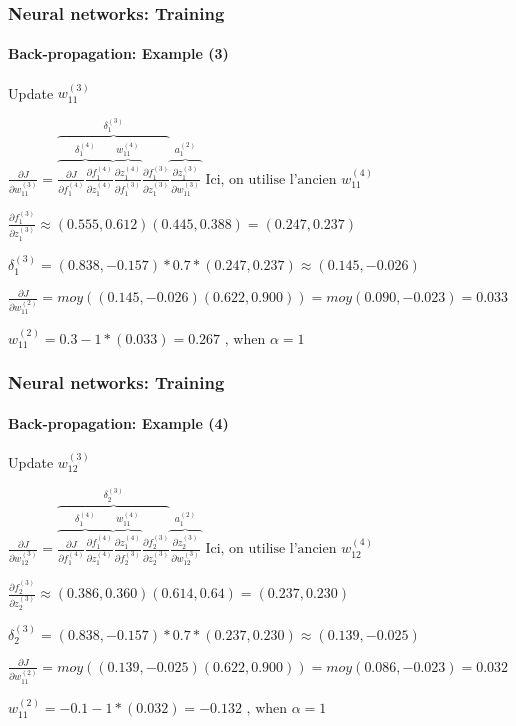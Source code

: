 \documentclass[xcolor=table]{beamer}
\begin{document}
\begin{frame}
	\frametitle{Neural networks: Training}
	\framesubtitle{Back-propagation: Example (3)}
	
	Update $w_{11}^{(3)}$
	
	$
	\frac{\partial J}{\partial w_{11}^{(3)}} = 
	\overbrace{
		\overbrace{
			\frac{\partial J}{\partial f_{1}^{(4)}} 
			\frac{\partial f_{1}^{(4)}}{\partial z_{1}^{(4)}}
		}^{\delta_{1}^{(4)}} 
		\overbrace{
			\frac{\partial z_{1}^{(4)}}{\partial f_{1}^{(3)}}
		}^{w_{11}^{(4)}} 
		\frac{\partial f_{1}^{(3)}}{\partial z_{1}^{(3)}} 
	}^{\delta_{1}^{(3)}} 
	\overbrace{
		\frac{\partial z_{1}^{(3)}}{\partial w_{11}^{(3)}}
	}^{a_{1}^{(2)}}
	\text{ Ici, on utilise l'ancien } w_{11}^{(4)}
	$
	
	$
	\frac{\partial f_{1}^{(3)}}{\partial z_{1}^{(3)}} \approx 
	(0.555, 0.612) (0.445, 0.388) = (0.247, 0.237)
	$
	
	$
	\delta_{1}^{(3)} = (0.838, -0.157) * 0.7 * (0.247, 0.237) \approx (0.145, -0.026)
	$
	
	$
	\frac{\partial J}{\partial w_{11}^{(2)}} = moy((0.145, -0.026) (0.622, 0.900)) 
	= moy(0.090, -0.023) = 0.033
	$
	
	$
	w_{11}^{(2)} = 0.3 - 1 * (0.033) = 0.267 \text{ , when } \alpha = 1
	$
	
\end{frame}


\begin{frame}
	\frametitle{Neural networks: Training}
	\framesubtitle{Back-propagation: Example (4)}
	
	Update $w_{12}^{(3)}$
	
	$
	\frac{\partial J}{\partial w_{12}^{(3)}} = 
	\overbrace{
		\overbrace{
			\frac{\partial J}{\partial f_{1}^{(4)}} 
			\frac{\partial f_{1}^{(4)}}{\partial z_{1}^{(4)}}
		}^{\delta_{1}^{(4)}} 
		\overbrace{
			\frac{\partial z_{1}^{(4)}}{\partial f_{2}^{(3)}}
		}^{w_{11}^{(4)}} 
		\frac{\partial f_{2}^{(3)}}{\partial z_{2}^{(3)}} 
	}^{\delta_{2}^{(3)}} 
	\overbrace{
		\frac{\partial z_{2}^{(3)}}{\partial w_{12}^{(3)}}
	}^{a_{1}^{(2)}}
	\text{ Ici, on utilise l'ancien } w_{12}^{(4)}
	$
	
	$
	\frac{\partial f_{2}^{(3)}}{\partial z_{2}^{(3)}} \approx 
	(0.386, 0.360) (0.614, 0.64) = (0.237, 0.230)
	$
	
	$
	\delta_{2}^{(3)} = (0.838, -0.157) * 0.7 * (0.237, 0.230) \approx (0.139, -0.025)
	$
	
	$
	\frac{\partial J}{\partial w_{11}^{(2)}} = moy((0.139, -0.025) (0.622, 0.900)) 
	= moy(0.086, -0.023) = 0.032
	$
	
	$
	w_{11}^{(2)} = - 0.1 - 1 * (0.032) = - 0.132 \text{ , when } \alpha = 1
	$
	
\end{frame}
\end{document}
